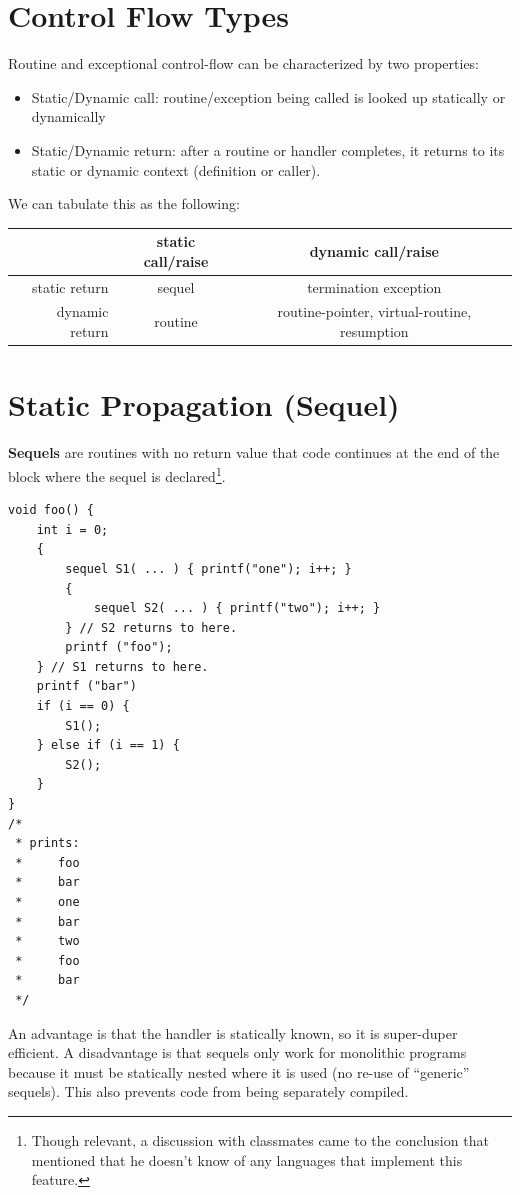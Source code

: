        \section{Control Flow Types} %
        \label{sec:control_flow_types}
            Routine and exceptional control-flow can be characterized by two properties:
            \begin{itemize}
                \item Static/Dynamic call: routine/exception being called is looked up statically or dynamically
                \item Static/Dynamic return: after a routine or handler completes, it returns to its static or dynamic context (definition or caller).
            \end{itemize}
            We can tabulate this as the following:
                \begin{table}[h]
                    \label{tbl:control-flow}
                    \centering
                    \begin{tabular}{ r || c | c}
                                        & static call/raise & dynamic call/raise \\ \hline \hline
                        static return   & sequel            & termination exception \\ \hline
                        dynamic return  & routine           & routine-pointer, virtual-routine, resumption
                    \end{tabular}
                \end{table}

        \section{Static Propagation (Sequel)} %
        \label{sec:static_propagation_sequel}
            \textbf{Sequels} are routines with no return value that code continues at the end of the block where the sequel is declared\footnote{Though relevant, a discussion with classmates came to the conclusion that  mentioned that he doesn't know of any languages that implement this feature.}.

                \begin{lstlisting}
void foo() {
    int i = 0;
    {
        sequel S1( ... ) { printf("one"); i++; }
        {
            sequel S2( ... ) { printf("two"); i++; }
        } // S2 returns to here.
        printf ("foo");
    } // S1 returns to here.
    printf ("bar")
    if (i == 0) {
        S1();
    } else if (i == 1) {
        S2();
    }
}
/*
 * prints:
 *     foo
 *     bar
 *     one
 *     bar
 *     two
 *     foo
 *     bar
 */
                \end{lstlisting}
            An advantage is that the handler is statically known, so it is super-duper efficient.
            A disadvantage is that sequels only work for monolithic programs because it must be statically nested where it is used (no re-use of ``generic'' sequels).
            This also prevents code from being separately compiled.

